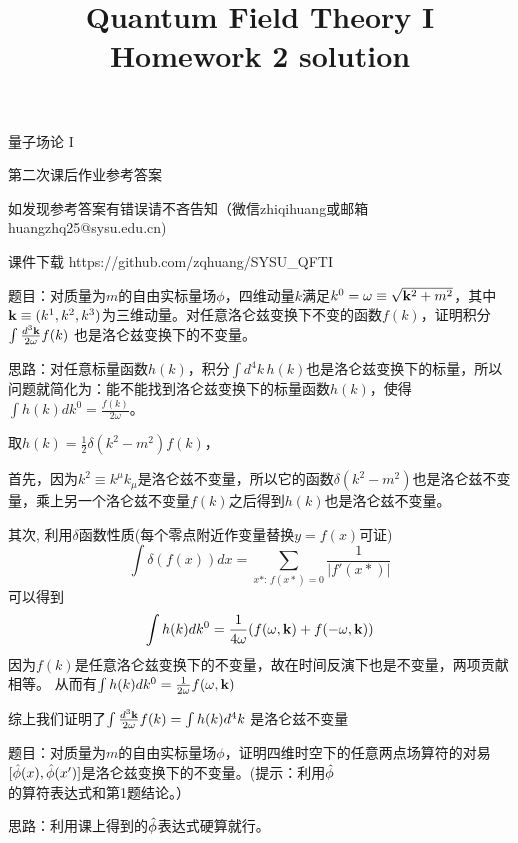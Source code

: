 \documentclass[CJK]{beamer}
\title{Quantum Field Theory I \\ Homework 2 solution}
\author{}
\date{}
\begin{document}
\begin{frame}
 
\begin{center}
\begin{Large}
\bch
量子场论 I 

{\vskip 0.3in}

第二次课后作业参考答案
\skipline
\skipline

如发现参考答案有错误请不吝告知（微信zhiqihuang或邮箱huangzhq25@sysu.edu.cn)
\ech
\end{Large}
\end{center}

\vskip 0.2in

\bch
课件下载
\ech
https://github.com/zqhuang/SYSU\_QFTI

\end{frame}

\begin{frame}
\bch
题目：对质量为$m$的自由实标量场$\phi$，四维动量$k$满足$k^0 = \omega \equiv \sqrt{{\mathbf{k}}^2+m^2}$，其中${\mathbf{k}}\equiv (k^1, k^2, k^3)$为三维动量。对任意洛仑兹变换下不变的函数$f(k)$，证明积分$\int \frac{d^3{\mathbf{k}}}{2\omega} f(k)$ 也是洛仑兹变换下的不变量。

\skipline
思路：对任意标量函数$h(k)$，积分$\int d^4k\, h(k)$也是洛仑兹变换下的标量，所以问题就简化为：能不能找到洛仑兹变换下的标量函数$h(k)$，使得 $\int h(k)d k^0 = \frac{f(k)}{2\omega}$。
\ech
\end{frame}

\begin{frame}
\bch
取$h(k) = \frac{1}{2} \delta(k^2 - m^2) f(k)$，

首先，因为$k^2 \equiv k^\mu k_\mu$是洛仑兹不变量，所以它的函数$\delta(k^2 - m^2)$也是洛仑兹不变量，乘上另一个洛仑兹不变量$f(k)$之后得到$h(k)$也是洛仑兹不变量。

其次, 利用$\delta$函数性质(每个零点附近作变量替换$y=f(x)$可证)
 $$\int \delta\left(f(x)\right) dx= \sum_{x*:\,f(x*) = 0}\frac{1}{|f'(x*)|}$$
可以得到
$$\int h(k) dk^0 = \frac{1}{4\omega}(f(\omega, {\mathbf{k}}) + f(-\omega, {\mathbf{k}}))$$
因为$f(k)$是任意洛仑兹变换下的不变量，故在时间反演下也是不变量，两项贡献相等。
从而有$\int h(k) dk^0 = \frac{1}{2\omega}f(\omega, {\mathbf{k}})$

综上我们证明了$\int \frac{d^3{\mathbf{k}}}{2\omega} f(k) = \int h(k) d^4k$ 是洛仑兹不变量
\ech
\end{frame}



\begin{frame}
\bch
题目：对质量为$m$的自由实标量场$\phi$，证明四维时空下的任意两点场算符的对易$[{\hat{\phi}}(x),{\hat{\phi}}(x')]$是洛仑兹变换下的不变量。(提示：利用${\hat{\phi}}$的算符表达式和第1题结论。）

\skipline
思路：利用课上得到的${\hat{\phi}}$表达式硬算就行。
\ech
\end{frame}
\end{document}
